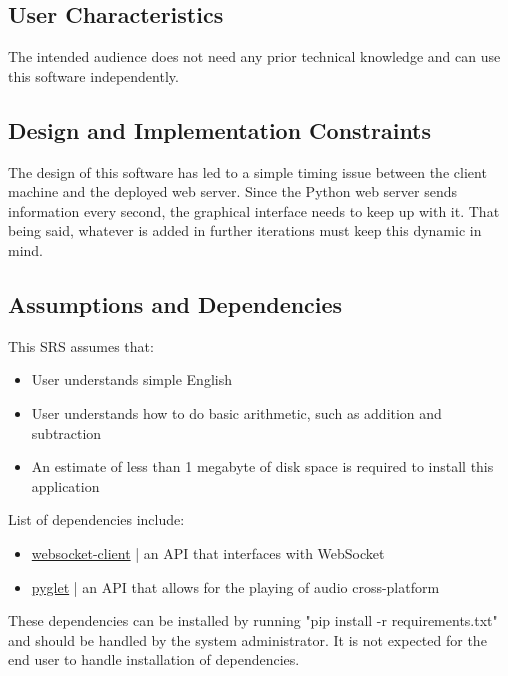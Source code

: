 \documentclass[12pt]{article}
\begin{document}
\subsection{User Characteristics}

The intended audience does not need any prior technical knowledge and can use this software independently.

\subsection{Design and Implementation Constraints}
The design of this software has led to a simple timing issue between the client machine and the deployed web server. 
Since the Python web server sends information every second, the graphical interface needs to keep up with it. 
That being said, whatever is added in further iterations must keep this dynamic in mind.

\subsection{Assumptions and Dependencies}

\begin{flushleft}

This SRS assumes that:

\begin{itemize}
\item User understands simple English
\item User understands how to do basic arithmetic, such as addition and subtraction
\item An estimate of less than 1 megabyte of disk space is required to install this application
\end{itemize}

List of dependencies include:

\begin{itemize}
\item \href{https://pypi.org/project/websocket_client/}{websocket-client} | an API that interfaces with WebSocket
\item \href{http://pyglet.org/}{pyglet} | an API that allows for the playing of audio cross-platform
\end{itemize}

\label{dependencies}

These dependencies can be installed by running "pip install -r requirements.txt" and should be handled by the system administrator.
It is not expected for the end user to handle installation of dependencies.

\end{flushleft}
\end{document}
